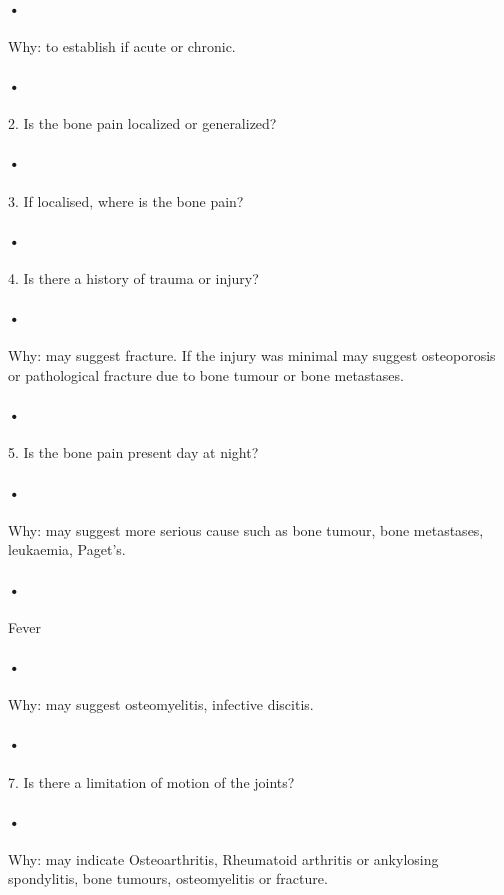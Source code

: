 \documentclass[12pt]{article}
\begin{document}
\paragraph{•}Why: to establish if acute or chronic.


\paragraph{•}2. Is the bone pain localized or generalized?

\paragraph{•}3. If localised, where is the bone pain?

\paragraph{•}4. Is there a history of trauma or injury?
\paragraph{•}Why: may suggest fracture. If the injury was minimal may suggest osteoporosis or pathological fracture due to bone tumour or bone metastases.

\paragraph{•}5. Is the bone pain present day at night?
\paragraph{•}Why: may suggest more serious cause such as bone tumour, bone metastases, leukaemia, Paget's.


\paragraph{•}Fever
\paragraph{•}Why: may suggest osteomyelitis, infective discitis.


\paragraph{•}7. Is there a limitation of motion of the joints?
\paragraph{•}Why: may indicate Osteoarthritis, Rheumatoid arthritis or ankylosing spondylitis, bone tumours, osteomyelitis or fracture.
\end{document}
